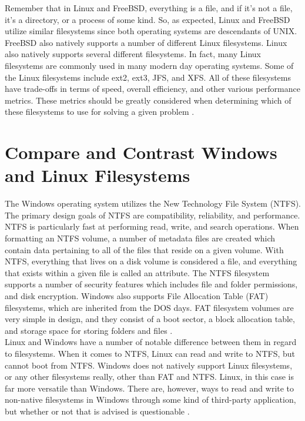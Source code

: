 \documentclass[letterpaper,10pt,draftclsnofoot,onecolumn]{IEEEtran}
\begin{document}
\noindent Remember that in Linux and FreeBSD, everything is a file, and if it’s not a file, it’s a directory, or a process of some kind. So, as expected, Linux and FreeBSD utilize similar filesystems since both operating systems are descendants of UNIX.  FreeBSD also natively supports a number of different Linux filesystems. Linux also natively supports several different filesystems. In fact, many Linux filesystems are commonly used in many modern day operating systems. Some of the Linux filesystems include ext2, ext3, JFS, and XFS. All of these filesystems have trade-offs in terms of speed, overall efficiency, and other various performance metrics. These metrics should be greatly considered when determining which of these filesystems to use for solving a given problem \cite{Linux1FS} \cite{Linux2FS}.\\

\section{Compare and Contrast Windows and Linux Filesystems}
\noindent The Windows operating system utilizes the New Technology File System (NTFS). The primary design goals of NTFS are compatibility, reliability, and performance. NTFS is particularly fast at performing read, write, and search operations. When formatting an NTFS volume, a number of metadata files are created which contain data pertaining to all of the files that reside on a given volume. With NTFS, everything that lives on a disk volume is considered a file, and everything that exists within a given file is called an attribute. The NTFS filesystem supports a number of security features which includes file and folder permissions, and disk encryption. Windows also supports File Allocation Table (FAT) filesystems, which are inherited from the DOS days. FAT filesystem volumes are very simple in design, and they consist of a boot sector, a block allocation table, and storage space for storing folders and files \cite{MSWindows1FS} \cite{MSWindows2FS}.\\

\noindent Linux and Windows have a number of notable difference between them in regard to filesystems. When it comes to NTFS, Linux can read and write to NTFS, but cannot boot from NTFS. Windows does not natively support Linux filesystems, or any other filesystems really, other than FAT and NTFS. Linux, in this case is far more versatile than Windows. There are, however, ways to read and write to non-native filesystems in Windows through some kind of third-party application, but whether or not that is advised is questionable \cite{Linux1FS} \cite{Linux2FS}.\\
\end{document}
